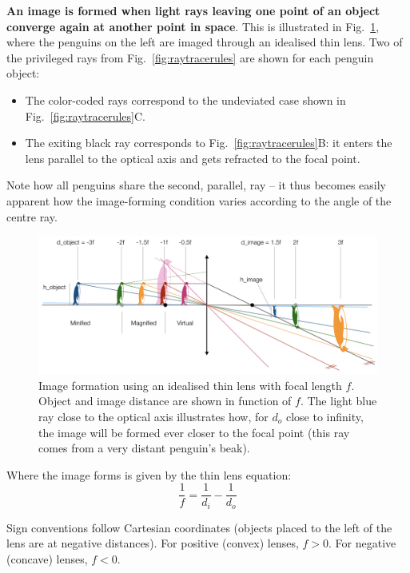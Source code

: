 \documentclass[a4paper]{report}
\begin{document}
	\textbf{An image is formed when light rays leaving one point of an object converge again at another point in space}.
	This is illustrated in Fig.~\ref{fig:imageforming}, where the penguins on the left are imaged through an idealised thin lens. 
	Two of the privileged rays from Fig.~\ref{fig:raytracerules} are shown for each penguin object:
	\begin{itemize}
	\item The color-coded rays correspond to the undeviated case shown in Fig.~\ref{fig:raytracerules}C. 
	\item The exiting black ray corresponds to Fig.~\ref{fig:raytracerules}B: it enters the lens parallel to the optical axis and gets refracted to the focal point.
	\end{itemize}
	Note how all penguins share the second, parallel, ray -- it thus becomes easily apparent how the image-forming condition varies according to the angle of the centre ray. 
	
	\begin{figure}[h]
		\center
		\includegraphics[width=1\textwidth]{figures/penguin_lens.png}
		\captionsetup{width=0.95\textwidth}
		\caption{Image formation using an idealised thin lens with focal length $f$. Object and image distance are shown in function of $f$. 
		The light blue ray close to the optical axis illustrates how, for $d_o$ close to infinity, the image will be formed ever closer to the focal point (this ray comes from a very distant penguin's beak).
		}
		\label{fig:imageforming}
	\end{figure}
	
	\noindent
	Where the image forms is given by the thin lens equation: 
	\begin{equation}
	\frac{1}{f} = \frac{1}{d_i} - \frac{1}{d_o}
	\label{eq:thinlens}
	\end{equation}
	
	Sign conventions follow Cartesian coordinates (objects placed to the left of the lens are at negative distances). For positive (convex) lenses, $f>0$. For negative (concave) lenses, $f<0$.
\end{document}
